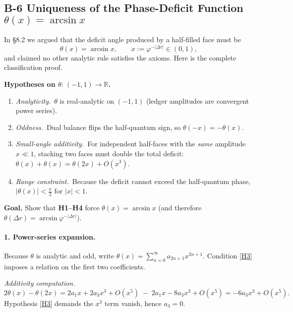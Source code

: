 \documentclass[11pt]{article}
\begin{document}
\subsection*{B-6 Uniqueness of the Phase-Deficit Function
\texorpdfstring{$\theta(x)=\arcsin x$}{θ(x)=arcsin x}}
\label{app:phase-deficit}

In §8.2 we argued that the deficit angle produced by a half-filled face
must be
\[
\theta(x)=\arcsin x,
\qquad x:=\varphi^{-|{\Delta r}|}\in(0,1),
\]
and claimed no other analytic rule satisfies the axioms.  Here is the
complete classification proof.

\bigskip
\textbf{Hypotheses on $\theta:\,(-1,1)\to\mathbb R$.}

\begin{enumerate}[label=\textbf{H\arabic*}.,leftmargin=1.9cm]
\item \emph{Analyticity.} $\theta$ is real-analytic on $(-1,1)$
      (ledger amplitudes are convergent power series).           \label{H1}
\item \emph{Oddness.} Dual balance flips the half-quantum sign, so
      $\theta(-x)=-\theta(x)$.                                   \label{H2}
\item \emph{Small-angle additivity.} For independent half-faces with the
      \emph{same} amplitude $x\ll1$, stacking two faces must double the
      total deficit:
      $\theta(x)+\theta(x)=\theta(2x)+O(x^{3})$.                  \label{H3}
\item \emph{Range constraint.} Because the deficit cannot exceed the
      half-quantum phase,
      $|\theta(x)|<\tfrac{\pi}{2}$ for $|x|<1$.                   \label{H4}
\end{enumerate}

\bigskip
\textbf{Goal.}  Show that \textbf{H1–H4} force
\(
\theta(x)=\arcsin x
\)
(and therefore
\(\theta(\Delta r)=\arcsin\varphi^{-|{\Delta r}|}\)).

\bigskip
\paragraph{1. Power-series expansion.}
Because $\theta$ is analytic and odd, write
\(
\theta(x)=\sum_{n=0}^{\infty}a_{2n+1}x^{2n+1}.
\)
Condition \ref{H3} imposes a relation on the first two coefficients.

\smallskip
\emph{Additivity computation.}
\[
2\theta(x)-\theta(2x)
  = 2a_{1}x + 2a_{3}x^{3} + O(x^{5})
    \;-\; 2a_{1}x - 8a_{3}x^{3} + O(x^{5})
  = -6a_{3}x^{3}+O(x^{5}).
\]
Hypothesis \ref{H3} demands the $x^{3}$ term vanish, hence
\(a_{3}=0\).
\end{document}
